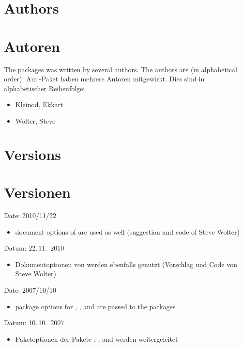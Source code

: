\ifENGLISH
 \section{Authors}
\fi
	\ifGERMAN
	 \section{Autoren}
	\fi
\label{sec:authors}

\ifENGLISH
 The  packages was written by several authors.
 The authors are (in alphabetical order):
\fi
	\ifGERMAN
	 Am -Paket haben mehrere Autoren mitgewirkt.
	 Dies sind in alphabetischer Reihenfolge:
	\fi
\begin{itemize}
 \item Kleinod, Ekkart
 \item Wolter, Steve
\end{itemize}

\ifENGLISH
 \section{Versions}
\fi
	\ifGERMAN
	 \section{Versionen}
	\fi
\label{sec:versions}


\ifENGLISH
 Date: 2010/11/22
 \begin{itemize}
	\item document options of  are used as well (suggestion and code of Steve Wolter)
 \end{itemize}
\fi
	\ifGERMAN
	 Datum: 22.\,11.~2010
	 \begin{itemize}
		\item Dokumentoptionen von  werden ebenfalls genutzt (Vorschlag und Code von Steve Wolter)
	 \end{itemize}
	\fi


\ifENGLISH
 Date: 2007/10/10
 \begin{itemize}
	\item package options for , , and  are passed to the packages
 \end{itemize}
\fi
	\ifGERMAN
	 Datum: 10.\,10.~2007
	 \begin{itemize}
		\item Paketoptionen der Pakete , , and  werden weitergeleitet
	 \end{itemize}
	\fi

